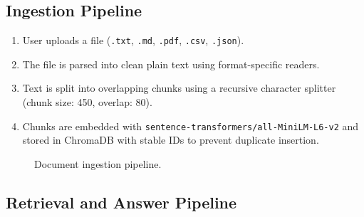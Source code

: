\documentclass[12pt,a4paper]{article}
\begin{document}
\subsection{Ingestion Pipeline}

\begin{enumerate}[leftmargin=*]
  \item User uploads a file (\texttt{.txt}, \texttt{.md}, \texttt{.pdf}, \texttt{.csv}, \texttt{.json}).
  \item The file is parsed into clean plain text using format-specific readers.
  \item Text is split into overlapping chunks using a recursive character splitter
        (chunk size: 450, overlap: 80).
  \item Chunks are embedded with \texttt{sentence-transformers/all-MiniLM-L6-v2} and
        stored in ChromaDB with stable IDs to prevent duplicate insertion.
\end{enumerate}

\begin{figure}[h!]
\centering
{}
\caption{Document ingestion pipeline.}
\label{fig:ingestion}
\end{figure}

\subsection{Retrieval and Answer Pipeline}
\end{document}
